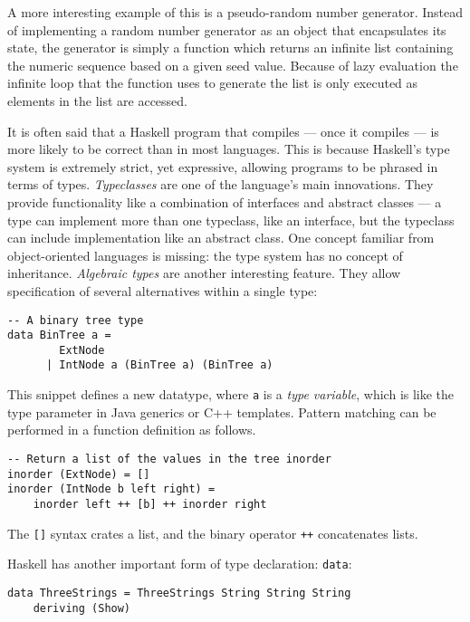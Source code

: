 A more interesting example of this is a pseudo-random number generator.
Instead of implementing a random number generator as an object that encapsulates its state, the generator is simply a function which returns an infinite list containing the numeric sequence based on a given seed value.
Because of lazy evaluation the infinite loop that the function uses to generate the list is only executed as elements in the list are accessed.


It is often said that a Haskell program that compiles --- once it compiles --- is more likely to be correct than in most languages.
This is because Haskell's type system is extremely strict, yet expressive, allowing programs to be phrased in terms of types.
\textit{Typeclasses} are one of the language's main innovations\cite{hudak2007history}.
They provide functionality like a combination of interfaces and abstract classes --- a type can implement more than one typeclass, like an interface, but the typeclass can include implementation like an abstract class.
One concept familiar from object-oriented languages is missing: the type system has no concept of inheritance.
\textit{Algebraic types} are another interesting feature.
They allow specification of several alternatives within a single type:

\begin{verbatim}
-- A binary tree type
data BinTree a =
        ExtNode
      | IntNode a (BinTree a) (BinTree a)
\end{verbatim}

\noindent This snippet defines a new datatype, where \verb!a! is a \textit{type variable}, which is like the type parameter in Java generics or C++ templates.
Pattern matching can be performed in a function definition as follows.

\begin{verbatim}
-- Return a list of the values in the tree inorder
inorder (ExtNode) = []
inorder (IntNode b left right) =
    inorder left ++ [b] ++ inorder right
\end{verbatim}

\noindent The \verb![]! syntax crates a list, and the binary operator \verb!++! concatenates lists.

Haskell has another important form of type declaration: \verb!data!:

\begin{verbatim}
data ThreeStrings = ThreeStrings String String String
    deriving (Show)
\end{verbatim}

